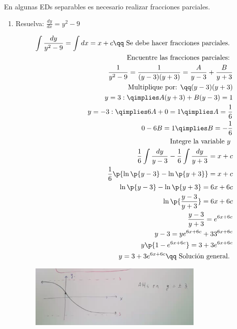 En algunas EDs separables es necesario realizar fracciones parciales.
\begin{enumerate}
    \item Resuelva: $\displaystyle \frac{d y}{d x} = y^2-9$
        \begin{center}
           \begin{align*}
               \int \frac{dy}{y^2-9} = \int dx = x+c \qq \text{ Se debe hacer fracciones parciales. } \\ 
                \text{ Encuentre las fracciones parciales: } \\ 
                \frac{1}{y^2-9} = \frac{1}{(y-3)(y+3)} = \frac{A}{y-3}+ \frac{B}{y+3} \\ 
                \text{ Multiplique por:  } \qq (y-3)(y+3) \\ 
                y = 3: \qimplies  A(y+3) + B(y-3) = 1 \\ 
                y = -3: \qimplies  6A + 0 = 1 \qimplies A = \frac{1}{6} \\ 
                0 - 6B = 1 \qimplies B=-\frac{1}{6} \\ 
                \text{ Integre la variable $y$ } \\ 
                \frac{1}{6}\int \frac{dy}{y-3} - \frac{1}{6}\int \frac{dy}{y+3} = x+c \\ 
                \frac{1}{6}\p{\ln\p{ y-3 } - \ln\p{ y+3 }  } = x+c \\ 
                \ln\p{ y-3 } -\ln\p{ y+3 } = 6x+6c \\ 
                \ln\p{ \frac{y-3}{y+3} } = 6x + 6c \\ 
                \frac{y-3}{y+3} = e^{6x + 6c} \\ 
                y-3 = ye^{6x+6c}+ 33^{6x+6c} \\ 
                y\p{1-e^{6x+6c}} = 3+3e^{6x+6c} \\ 
                y = 3+3e^{6x+6c} \qq \text{ Solución general. } \\ 
           \end{align*}
           \begin{figure}[H]
               \centering
               \includegraphics[width=0.8\textwidth]{./Figs/2021-01-18-10-58-09.png}
           \end{figure}
        \end{center}
    

\end{enumerate}
